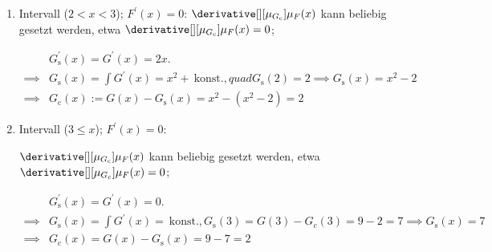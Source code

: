 \begin{solution}
\begin{enumerate}
    \item Intervall ($2 < x < 3$); $F^\prime(x) = 0$:
    $\derivative[][\mu_{G_\mathrm{c}}]{\mu_F}(x)$ kann beliebig gesetzt werden, etwa $\derivative[][\mu_{G_\mathrm{c}}]{\mu_F}(x) = 0$;

    \begin{align*}
        &
        G_\mathrm{s}^\prime(x) = G^\prime(x) = 2 x. \\
        \implies &
        G_\mathrm{s}(x) = \int G^\prime(x) = x^2 + ~\text{konst.}, quad G_\mathrm{s}(2) = 2 \implies G_\mathrm{s}(x) = x^2 - 2 \\
        \implies &
        G_\mathrm{c}(x) := G(x) - G_\mathrm{s}(x) = x^2 - (x^2 - 2) = 2
    \end{align*}

    \item Intervall ($3 \leq x$); $F^\prime(x) = 0$:

    $\derivative[][\mu_{G_\mathrm{c}}]{\mu_F}(x)$ kann beliebig gesetzt werden, etwa $\derivative[][\mu_{G_c}]{\mu_F}(x) = 0$;

    \begin{align*}
        &
        G_\mathrm{s}^\prime(x) = G^\prime(x) = 0. \\
        \implies &
        G_\mathrm{s}(x) = \int G^\prime(x) = ~\text{konst.}, G_\mathrm{s}(3) = G(3) - G_c(3) = 9 - 2 = 7 \implies G_\mathrm{s}(x) = 7 \\
        \implies &
        G_\mathrm{c}(x) = G(x) - G_\mathrm{s}(x) = 9 - 7 = 2
    \end{align*}

\end{enumerate}

\end{solution}

    